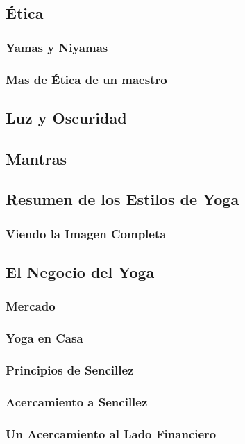 \documentclass[a4paper]{article}
\begin{document}
\subsection{\'{E}tica}
\subsubsection{Yamas y Niyamas}
\subsubsection{Mas de \'{E}tica de un maestro}
\subsection{Luz y Oscuridad}
\subsection{Mantras}
\subsection{Resumen de los Estilos de Yoga}
\subsubsection{Viendo la Imagen Completa}
\subsection{El Negocio del Yoga}
\subsubsection{Mercado}
\subsubsection{Yoga en Casa}
\subsubsection{Principios de Sencillez}
\subsubsection{Acercamiento a Sencillez}
\subsubsection{Un Acercamiento al Lado Financiero}
\end{document}
